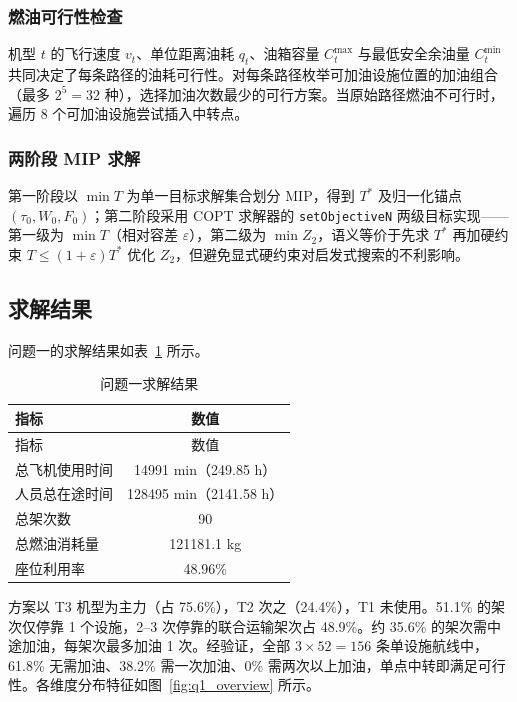 \documentclass[withoutpreface]{cumcmthesis}
\begin{document}
\subsubsection{燃油可行性检查}

机型 $t$ 的飞行速度 $v_t$、单位距离油耗 $q_t$、油箱容量 $C_t^{\max}$ 与最低安全余油量 $C_t^{\min}$ 共同决定了每条路径的油耗可行性。对每条路径枚举可加油设施位置的加油组合（最多 $2^5 = 32$ 种），选择加油次数最少的可行方案。当原始路径燃油不可行时，遍历 8 个可加油设施尝试插入中转点。

\subsubsection{两阶段 MIP 求解}

第一阶段以 $\min T$ 为单一目标求解集合划分 MIP，得到 $T^*$ 及归一化锚点 $(\tau_0, W_0, F_0)$；第二阶段采用 COPT 求解器的 \texttt{setObjectiveN} 两级目标实现——第一级为 $\min T$（相对容差 $\varepsilon$），第二级为 $\min Z_2$，语义等价于先求 $T^*$ 再加硬约束 $T \leq (1+\varepsilon)T^*$ 优化 $Z_2$，但避免显式硬约束对启发式搜索的不利影响\cite{hu2018}。

\subsection{求解结果}

问题一的求解结果如表~\ref{tab:q1_result} 所示。

\begin{longtable}{lc}
\caption{问题一求解结果} \label{tab:q1_result} \\
\toprule
指标 & 数值 \\
\midrule
\endfirsthead
\toprule
指标 & 数值 \\
\midrule
\endhead
\bottomrule
\endfoot
\bottomrule
\endlastfoot
总飞机使用时间 & 14991 min（249.85 h） \\
人员总在途时间 & 128495 min（2141.58 h） \\
总架次数 & 90 \\
总燃油消耗量 & 121181.1 kg \\
座位利用率 & 48.96\% \\
\end{longtable}

方案以 T3 机型为主力（占 75.6\%），T2 次之（24.4\%），T1 未使用。51.1\% 的架次仅停靠 1 个设施，2--3 次停靠的联合运输架次占 48.9\%。约 35.6\% 的架次需中途加油，每架次最多加油 1 次。经验证，全部 $3 \times 52 = 156$ 条单设施航线中，61.8\% 无需加油、38.2\% 需一次加油、0\% 需两次以上加油，单点中转即满足可行性。各维度分布特征如图~\ref{fig:q1_overview} 所示。
\end{document}
